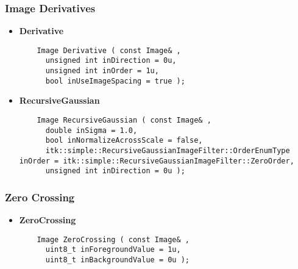 \begin{frame}[fragile]
\frametitle{Image Derivatives}

\begin{itemize}
  \item {\bf Derivative}
\begin{lstlisting}
    Image Derivative ( const Image& ,
      unsigned int inDirection = 0u,
      unsigned int inOrder = 1u,
      bool inUseImageSpacing = true );
\end{lstlisting}
  \item {\bf RecursiveGaussian}
\begin{lstlisting}
    Image RecursiveGaussian ( const Image& ,
      double inSigma = 1.0,
      bool inNormalizeAcrossScale = false,
      itk::simple::RecursiveGaussianImageFilter::OrderEnumType inOrder = itk::simple::RecursiveGaussianImageFilter::ZeroOrder,
      unsigned int inDirection = 0u );
\end{lstlisting}
\end{itemize}

\end{frame}

\begin{frame}[fragile]
\frametitle{Zero Crossing}
  

\begin{itemize}
  \item {\bf ZeroCrossing }
\begin{lstlisting}
    Image ZeroCrossing ( const Image& ,
      uint8_t inForegroundValue = 1u,
      uint8_t inBackgroundValue = 0u );
\end{lstlisting}
\end{itemize}

\end{frame}



